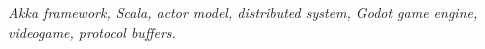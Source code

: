 \textit{
    Akka framework, Scala, actor model, distributed system, Godot game engine, videogame, protocol buffers.
}